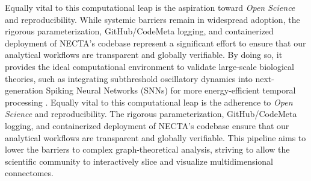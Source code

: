 Equally vital to this computational leap is the aspiration toward \textit{Open Science} and reproducibility. While systemic barriers remain in widespread adoption, the rigorous parameterization, GitHub/CodeMeta logging, and containerized deployment of NECTA’s codebase represent a significant effort to ensure that our analytical workflows are transparent and globally verifiable. By doing so, it provides the ideal computational environment to validate large-scale biological theories, such as integrating subthreshold oscillatory dynamics into next-generation Spiking Neural Networks (SNNs) for more energy-efficient temporal processing \cite{Lassers2026}. Equally vital to this computational leap is the adherence to \textit{Open Science} and reproducibility. The rigorous parameterization, GitHub/CodeMeta logging, and containerized deployment of NECTA’s codebase ensure that our analytical workflows are transparent and globally verifiable. This pipeline aims to lower the barriers to complex graph-theoretical analysis, striving to allow the scientific community to interactively slice and visualize multidimensional connectomes.

